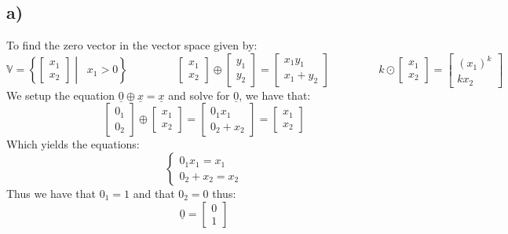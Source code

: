 \documentclass{article}
\begin{document}
\subsection*{a)}
To find the zero vector in the vector space given by: $$\mathbb{V}=\left\{ \begin{bmatrix} 
x_{1}\\x_{2}
\end{bmatrix} \middle|\;\; x_{1} > 0 \right\}\;\;\;\;\;\;\;\;\;\;\;\;\;\;\;\;\begin{bmatrix} 
x_{1}\\x_{2}
\end{bmatrix}\oplus\begin{bmatrix} 
y_{1}\\y_{2}
\end{bmatrix}=\begin{bmatrix} 
x_{1}y_{1}\\
x_{1}+y_{2}
\end{bmatrix}\;\;\;\;\;\;\;\;\;\;\;\;\;\;\;\;k\odot\begin{bmatrix} 
x_{1}\\x_{2}
\end{bmatrix}=\begin{bmatrix} 
(x_{1})^{k}\\kx_{2}
\end{bmatrix}$$
We setup the equation $\underline{0}\oplus\underline{x}=\underline{x}$ and solve for $\underline{0}$, we have that:
$$\begin{bmatrix} 
0_{1}\\
0_{2}
\end{bmatrix}\oplus\begin{bmatrix} 
x_{1}\\x_{2}
\end{bmatrix}
=
\begin{bmatrix} 
0_{1}x_{1}\\
0_{2}+x_{2}
\end{bmatrix}=\begin{bmatrix} 
x_{1}\\x_{2}
\end{bmatrix}$$
Which yields the equations: $$\begin{cases}
0_{1}x_{1}=x_{1}\\
0_{2}+x_{2}=x_{2}
\end{cases}$$
Thus we have that $0_{1}=1$ and that $0_{2}=0$ thus: $$\underline{0}=\begin{bmatrix} 
0\\1
\end{bmatrix}$$
\end{document}
